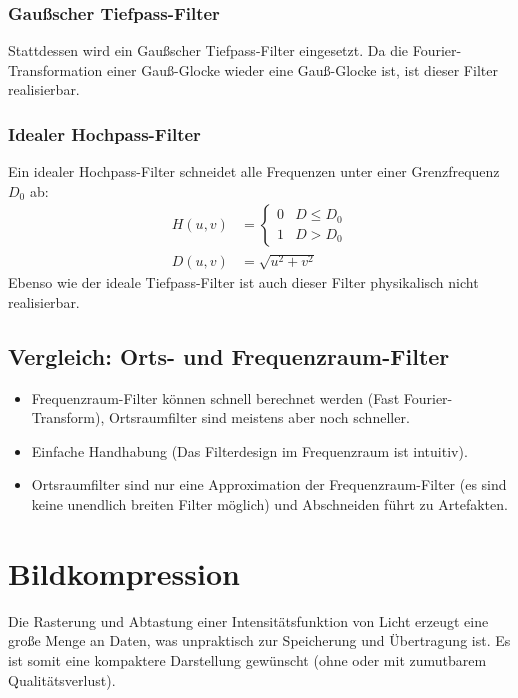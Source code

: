 		\subsubsection{Gaußscher Tiefpass-Filter}
			Stattdessen wird ein Gaußscher Tiefpass-Filter eingesetzt. Da die Fourier-Transformation einer Gauß-Glocke wieder eine Gauß-Glocke ist, ist dieser Filter realisierbar.

		\subsubsection{Idealer Hochpass-Filter}
			Ein idealer Hochpass-Filter schneidet alle Frequenzen unter einer Grenzfrequenz \( D_0 \) ab:
			\begin{align*}
				H(u, v) & =
				\begin{cases}
					0 & D \leq D_0 \\
					1 & D > D_0
				\end{cases}               \\
				D(u, v) & = \sqrt{u^2 + v^2}
			\end{align*}
			Ebenso wie der ideale Tiefpass-Filter ist auch dieser Filter physikalisch nicht realisierbar.

	\subsection{Vergleich: Orts- und Frequenzraum-Filter}
		\begin{itemize}
			\item Frequenzraum-Filter können schnell berechnet werden (Fast Fourier-Transform), Ortsraumfilter sind meistens aber noch schneller.
			\item Einfache Handhabung (Das Filterdesign im Frequenzraum ist intuitiv).
			\item Ortsraumfilter sind nur eine Approximation der Frequenzraum-Filter (es sind keine unendlich breiten Filter möglich) und Abschneiden führt zu Artefakten.
		\end{itemize}

	\section{Bildkompression}
		Die Rasterung und Abtastung einer Intensitätsfunktion von Licht erzeugt eine große Menge an Daten, was unpraktisch zur Speicherung und Übertragung ist. Es ist somit eine kompaktere Darstellung gewünscht (ohne oder mit zumutbarem Qualitätsverlust).


